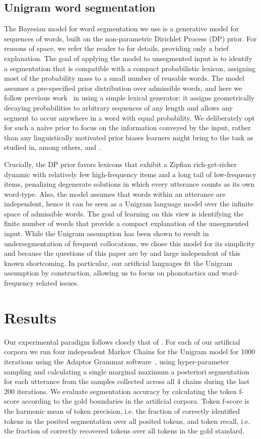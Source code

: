 \documentclass[11pt]{article}
\begin{document}
\subsection{Unigram word segmentation}

The Bayesian model for word segmentation we use is a generative model for sequences of words, built on the non-parametric Dirichlet Process (DP) prior. For reasons of space, we refer the reader to \cite{Goldwater07c} for details, providing only a brief explanation. The goal of applying the model to unsegmented input is to identify a segmentation that is compatible with a compact probabilistic lexicon, assigning most of the probability mass to a small number of reusable words. The model assumes a pre-specified prior distribution over admissible words, and here we follow previous work~\cite{Brent99a,Goldwater07c} in using a simple lexical generator: it assigns geometrically decaying probabilities to arbitrary sequences of any length and allows any segment to occur anywhere in a word with equal probability. We deliberately opt for such a na\"{i}ve prior to focus on the information conveyed by the input, rather than any linguistically motivated prior biases learners might bring to the task as studied in, among others, \cite{Johnson09a} and \cite{Borschinger12b}.

Crucially, the DP prior favors lexicons that exhibit a Zipfian rich-get-richer dynamic with relatively few high-frequency items and a long tail of low-frequency items, penalizing degenerate solutions in which every utterance counts as its own word-type. Also, the model assumes that words within an utterance are independent, hence it can be seen as a Unigram language model over the infinite space of admissible words. The goal of learning on this view is identifying the finite number of words that provide a compact explanation of the unsegmented input. While the Unigram assumption has been shown to result in undersegmentation of frequent collocations, we chose this model for its simplicity and because the questions of this paper are by and large independent of this known shortcoming. In particular, our artificial languages fit the Unigram assumption by construction, allowing us to focus on phonotactics and word-frequency related issues.

\section{Results}
Our experimental paradigm follows closely that of \cite{Johnson09a}. For each of our artificial corpora we run four independent Markov Chains for the Unigram model for 1000 iterations using the Adaptor Grammar software~\cite{Johnson07c}, using hyper-parameter sampling and calculating a single marginal maximum a posteriori segmentation for each utterance from the samples collected across all 4 chains during the last 200 iterations. We evaluate segmentation accuracy by calculating the token f-score according to the gold boundaries in the artificial corpora. Token f-score is the harmonic mean of token precision, i.e. the fraction of correctly identified tokens in the posited segmentation over all posited tokens, and token recall, i.e. the fraction of correctly recovered tokens over all tokens in the gold standard. 
\end{document}
